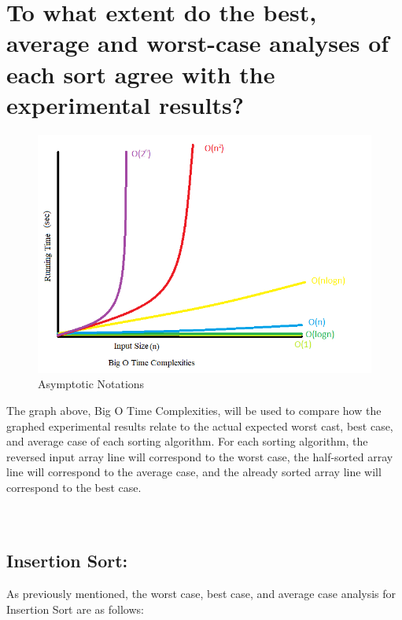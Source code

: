\documentclass[12pt]{article}
\begin{document}
\section{To what extent do the best, average and worst-case analyses of each sort agree with the experimental results?}

\begin{figure}[h]

	\centering
	\includegraphics[width=\textwidth]{Asymptotic Notations.PNG}
\caption{Asymptotic Notations}
    \label{fig:mesh1}
\end{figure}
	The graph above, Big O Time Complexities, will be used to compare how the graphed experimental results relate to the actual expected worst cast, best case, and average case of each sorting algorithm. For each sorting algorithm, the reversed input array line will correspond to the worst case, the half-sorted array line will correspond to the average case, and the already sorted  array line will correspond to the best case.\\
\\
\\


	\subsection{Insertion Sort:}

	As previously mentioned, the worst case, best case, and average case analysis for Insertion Sort are as follows: \\	
\end{document}
